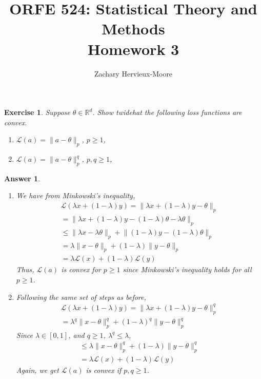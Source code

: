 \documentclass[12pt]{article}
\title{ORFE 524: Statistical Theory and Methods \\ Homework 3}
\author{Zachary Hervieux-Moore}
\date{\displaydate{date}}
\theoremstyle{colon}
\newtheorem{exercise}{Exercise}
\newtheorem*{answer}{Answer}
\begin{document}
\maketitle

\clearpage

\begin{exercise}
  Suppose $\theta \in \mathbb{R}^d$. Show twidehat the following loss functions are convex.
  \begin{enumerate}[label=\arabic*)]
    \item $\mathcal{L}(a) = \lVert a - \theta \rVert_p$, $p \geq 1$,
    \item $\mathcal{L}(a) = \lVert a - \theta \rVert_p^q$, $p,q \geq 1$,
  \end{enumerate}
\end{exercise}

\begin{answer}
  \leavevmode
  \begin{enumerate}[label=\arabic*)]
    \item We have from Minkowski's inequality,
      \begin{gather*}
        \mathcal{L}(\lambda x + (1-\lambda)y) = \lVert \lambda x + (1-\lambda)y - \theta \rVert_p \\
        = \lVert \lambda x + (1-\lambda)y - (1-\lambda)\theta - \lambda \theta \rVert_p \\
        \leq \lVert \lambda x - \lambda \theta \rVert_p + \lVert (1-\lambda)y - (1-\lambda) \theta \rVert_p \\
        = \lambda \lVert x - \theta \rVert_p + (1 - \lambda) \lVert y - \theta \rVert_p \\
        = \lambda \mathcal{L}(x) + (1-\lambda) \mathcal{L}(y)
      \end{gather*}
      Thus, $\mathcal{L}(a)$ is convex for $p \geq 1$ since Minkowski's inequality holds for all $p \geq 1$.
    \item Following the same set of steps as before,
      \begin{gather*}
        \mathcal{L}(\lambda x + (1-\lambda)y) = \lVert \lambda x + (1-\lambda)y - \theta \rVert_p^q \\
        = \lambda^q \lVert x - \theta \rVert_p^q + (1 - \lambda)^q \lVert y - \theta \rVert_p^q
      \end{gather*}
      Since $\lambda \in [0,1]$, and $q \geq 1$, $\lambda^q \leq \lambda$,
      \begin{gather*}
        \leq \lambda \lVert x - \theta \rVert_p^q + (1 - \lambda) \lVert y - \theta \rVert_p^q \\
        = \lambda \mathcal{L}(x) + (1-\lambda) \mathcal{L}(y)
      \end{gather*}
      Again, we get $\mathcal{L}(a)$ is convex if $p,q \geq 1$.
  \end{enumerate}
\end{answer}
\end{document}
